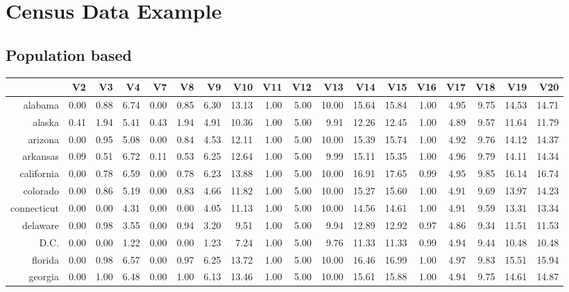 \documentclass{article} %
\begin{document}
\section{Census Data Example}

\subsection{Population based}

\begin{table}[ht]
\centering
\begin{tabular}{rrrrrrrrrrrrrrrrrr}
  \hline
 & V2 & V3 & V4 & V7 & V8 & V9 & V10 & V11 & V12 & V13 & V14 & V15 & V16 & V17 & V18 & V19 & V20 \\
  \hline
alabama & 0.00 & 0.88 & 6.74 & 0.00 & 0.85 & 6.30 & 13.13 & 1.00 & 5.00 & 10.00 & 15.64 & 15.84 & 1.00 & 4.95 & 9.75 & 14.53 & 14.71 \\
  alaska & 0.41 & 1.94 & 5.41 & 0.43 & 1.94 & 4.91 & 10.36 & 1.00 & 5.00 & 9.91 & 12.26 & 12.45 & 1.00 & 4.89 & 9.57 & 11.64 & 11.79 \\
  arizona & 0.00 & 0.95 & 5.08 & 0.00 & 0.84 & 4.53 & 12.11 & 1.00 & 5.00 & 10.00 & 15.39 & 15.74 & 1.00 & 4.92 & 9.76 & 14.12 & 14.37 \\
  arkansas & 0.09 & 0.51 & 6.72 & 0.11 & 0.53 & 6.25 & 12.64 & 1.00 & 5.00 & 9.99 & 15.11 & 15.35 & 1.00 & 4.96 & 9.79 & 14.11 & 14.34 \\
  california & 0.00 & 0.78 & 6.59 & 0.00 & 0.78 & 6.23 & 13.88 & 1.00 & 5.00 & 10.00 & 16.91 & 17.65 & 0.99 & 4.95 & 9.85 & 16.14 & 16.74 \\
  colorado & 0.00 & 0.86 & 5.19 & 0.00 & 0.83 & 4.66 & 11.82 & 1.00 & 5.00 & 10.00 & 15.27 & 15.60 & 1.00 & 4.91 & 9.69 & 13.97 & 14.23 \\
  connecticut & 0.00 & 0.00 & 4.31 & 0.00 & 0.00 & 4.05 & 11.13 & 1.00 & 5.00 & 10.00 & 14.56 & 14.61 & 1.00 & 4.91 & 9.59 & 13.31 & 13.34 \\
  delaware & 0.00 & 0.98 & 3.55 & 0.00 & 0.94 & 3.20 & 9.51 & 1.00 & 5.00 & 9.94 & 12.89 & 12.92 & 0.97 & 4.86 & 9.34 & 11.51 & 11.53 \\
  D.C. & 0.00 & 0.00 & 1.22 & 0.00 & 0.00 & 1.23 & 7.24 & 1.00 & 5.00 & 9.76 & 11.33 & 11.33 & 0.99 & 4.94 & 9.44 & 10.48 & 10.48 \\
  florida & 0.00 & 0.98 & 6.57 & 0.00 & 0.97 & 6.25 & 13.72 & 1.00 & 5.00 & 10.00 & 16.46 & 16.99 & 1.00 & 4.97 & 9.83 & 15.51 & 15.94 \\
  georgia & 0.00 & 1.00 & 6.48 & 0.00 & 1.00 & 6.13 & 13.46 & 1.00 & 5.00 & 10.00 & 15.61 & 15.88 & 1.00 & 4.94 & 9.75 & 14.61 & 14.87 \\

\end{tabular}
\end{table}
\end{document}
